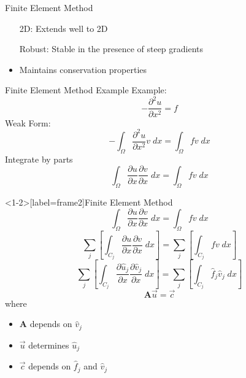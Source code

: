 \documentclass[]{beamer}
\begin{document}
\begin{frame}{Finite Element Method}
	\begin{itemize}
		\item[2D:] Extends well to 2D
		\item[Robust:] Stable in the presence of steep gradients 
		\item Maintains conservation properties
	\end{itemize}
\end{frame}

\begin{frame}{Finite Element Method Example}
	Example:
		\[  -\frac{\partial^2 {u}}{\partial x^2}= f\]
		\pause
	Weak Form:
	\[
	 -\int_{\Omega }\frac{\partial^2 {u}}{\partial x^2} v \; dx = \int_{\Omega } f v \; dx
	\]
	\pause
	Integrate by parts %
	\[
  \int_{\Omega }\frac{\partial {u}}{\partial x} \frac{\partial {v}}{\partial x} \; dx  = \int_{\Omega } f v \; dx
	\]
\end{frame}

\begin{frame}<1-2>[label=frame2]{Finite Element Method}
	\[
	 \int_{\Omega }\frac{\partial {u}}{\partial x} \frac{\partial {v}}{\partial x} \; dx  = \int_{\Omega } f v \; dx
	\]
	\pause
	\[
	 \sum_j  \left[\int_{C_j} \frac{\partial {u}}{\partial x} \frac{\partial {v}}{\partial x} \; dx \right] = \sum_j \left[ \int_{C_j} f v  \; dx \right]
	\]
	\pause
		\[
		\sum_j  \left[\int_{C_j} \frac{\partial {\hat{u}_j }}{\partial x} \frac{\partial {\hat{v}_j }}{\partial x} \; dx\right]  = \sum_j \left[ \int_{C_j} \hat{f}_j \hat{v}_j  \; dx \right]
		\]
	\pause
		\begin{equation*}
		\boldsymbol{A} \vec{u} = \vec{c}
		\end{equation*}
	\pause
		where 
		\begin{itemize}
			\item $\boldsymbol{A}$ depends on $\hat{v}_j$
			\item $\vec{u}$ determines $\hat{u}_j$
			\item $\vec{c}$ depends on $\hat{f}_j$ and $\hat{v}_j$
		\end{itemize}
\end{frame}
\end{document}
